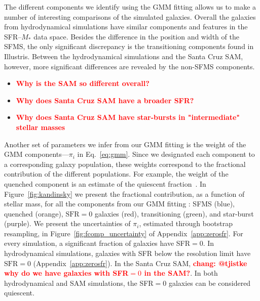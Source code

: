 \documentclass[preprint2,tighten]{aastex62}
\newcommand{\todo}[1]{{\bf \textcolor{red}{ #1}}}
\begin{document}
The different components we identify using the GMM fitting allows us to make a 
number of interesting comparisons of the simulated galaxies. Overall
the galaxies from hydrodynamical simulations have similar components
and features in the SFR--$M_*$ data space. Besides the difference in the 
position and width of the SFMS, 
the only significant discrepancy is the transitioning components found in  
Illustris. 
Between the hydrodynamical simulations and the Santa Cruz SAM, however,
more significant differences are revealed by the non-SFMS components. 
\begin{itemize}
    \item \todo{Why is the SAM so different overall?}
    \item \todo{Why does Santa Cruz SAM have a broader SFR?} 
    \item \todo{Why does Santa Cruz SAM have star-bursts in "intermediate" stellar masses}
\end{itemize}

Another set of parameters we infer from our GMM fitting is the weight of the 
GMM components---$\pi_i$ in Eq.~\ref{eq:gmm}. Since we designated each component 
to a corresponding galaxy population, these weights correspond to the fractional
contribution of the different populations. For example, the weight of the 
quenched component is an estimate of the quiescent 
fraction~\citep[\emph{e.g.}][]{blanton2009, geha2012, hahn2015}. In 
Figure~\ref{fig:kandinsky} we present the fractional contribution, as a function 
of stellar mass, for all the components from our GMM fitting : SFMS (blue), 
quenched (orange), $\mathrm{SFR}=0$ galaxies (red), transitioning (green), 
and star-burst (purple). We present the uncertainties of $\pi_i$, estimated
through bootstrap resampling, in Figure~\ref{fig:fcomp_uncertainty} of 
Appendix~\ref{app:zerosfr}. 
For every simulation, a significant fraction of galaxies have SFR$=0$. 
In hydrodynamical simulations, galaxies with SFR below the resolution 
limit have $\mathrm{SFR}{=}0$ (Appendix~\ref{app:zerosfr}). In the Santa 
Cruz SAM, \todo{chang: @tjistke why do we have galaxies with SFR$=0$ 
in the SAM?}. In both hydrodynamical and SAM simulations, the SFR$=0$ 
galaxies can be considered quiescent. 
\end{document}
